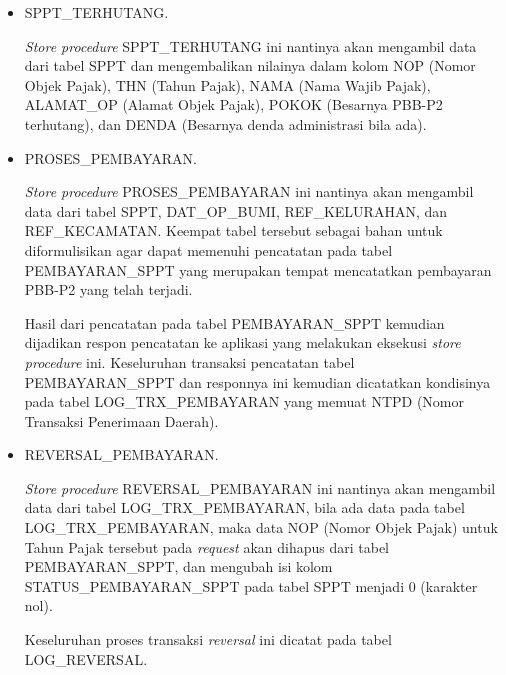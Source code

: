 \begin{itemize}
  \item SPPT_TERHUTANG. 
  
    \textit{Store procedure} SPPT_TERHUTANG ini nantinya akan mengambil data dari tabel SPPT dan mengembalikan nilainya dalam kolom NOP (Nomor Objek Pajak), THN (Tahun Pajak), NAMA (Nama Wajib Pajak), ALAMAT_OP (Alamat Objek Pajak), POKOK (Besarnya PBB-P2 terhutang), dan DENDA (Besarnya denda administrasi bila ada).

  \item PROSES_PEMBAYARAN. 
  
    \textit{Store procedure} PROSES_PEMBAYARAN ini nantinya akan mengambil data dari tabel SPPT, DAT_OP_BUMI, REF_KELURAHAN, dan REF_KECAMATAN. Keempat tabel tersebut sebagai bahan untuk diformulisikan agar dapat memenuhi pencatatan pada tabel PEMBAYARAN_SPPT yang merupakan tempat mencatatkan pembayaran PBB-P2 yang telah terjadi.
  
    Hasil dari pencatatan pada tabel PEMBAYARAN_SPPT kemudian dijadikan respon pencatatan ke aplikasi yang melakukan eksekusi \textit{store procedure} ini. Keseluruhan transaksi pencatatan tabel PEMBAYARAN_SPPT dan responnya ini kemudian dicatatkan kondisinya pada tabel LOG_TRX_PEMBAYARAN yang memuat NTPD (Nomor Transaksi Penerimaan Daerah).

  \item REVERSAL_PEMBAYARAN.
  
    \textit{Store procedure} REVERSAL_PEMBAYARAN ini nantinya akan mengambil data dari tabel LOG_TRX_PEMBAYARAN, bila ada data pada tabel LOG_TRX_PEMBAYARAN, maka data NOP (Nomor Objek Pajak) untuk Tahun Pajak tersebut pada \textit{request} akan dihapus dari tabel PEMBAYARAN_SPPT, dan mengubah isi kolom STATUS_PEMBAYARAN_SPPT pada tabel SPPT menjadi 0 (karakter nol).
    
    Keseluruhan proses transaksi \textit{reversal} ini dicatat pada tabel LOG_REVERSAL.
\end{itemize}
